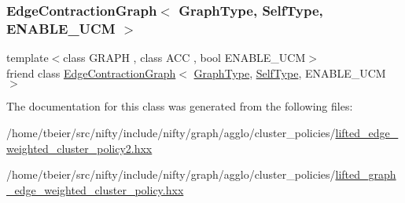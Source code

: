\subsubsection{\texorpdfstring{Edge\+Contraction\+Graph$<$ Graph\+Type, Self\+Type, E\+N\+A\+B\+L\+E\+\_\+\+U\+C\+M $>$}{EdgeContractionGraph< GraphType, SelfType, ENABLE\_UCM >}}
{\footnotesize\ttfamily template$<$class G\+R\+A\+PH , class A\+CC , bool E\+N\+A\+B\+L\+E\+\_\+\+U\+CM$>$ \\
friend class \hyperlink{classnifty_1_1graph_1_1EdgeContractionGraph}{Edge\+Contraction\+Graph}$<$ \hyperlink{classnifty_1_1graph_1_1agglo_1_1LiftedGraphEdgeWeightedClusterPolicy_a09555efd4d9896f60e2225f905a6600c}{Graph\+Type}, \hyperlink{classnifty_1_1graph_1_1agglo_1_1LiftedGraphEdgeWeightedClusterPolicy}{Self\+Type}, E\+N\+A\+B\+L\+E\+\_\+\+U\+CM $>$\hspace{0.3cm}{\ttfamily [friend]}}



The documentation for this class was generated from the following files\+:\begin{DoxyCompactItemize}
\item 
/home/tbeier/src/nifty/include/nifty/graph/agglo/cluster\+\_\+policies/\hyperlink{lifted__edge__weighted__cluster__policy2_8hxx}{lifted\+\_\+edge\+\_\+weighted\+\_\+cluster\+\_\+policy2.\+hxx}\item 
/home/tbeier/src/nifty/include/nifty/graph/agglo/cluster\+\_\+policies/\hyperlink{lifted__graph__edge__weighted__cluster__policy_8hxx}{lifted\+\_\+graph\+\_\+edge\+\_\+weighted\+\_\+cluster\+\_\+policy.\+hxx}\end{DoxyCompactItemize}
